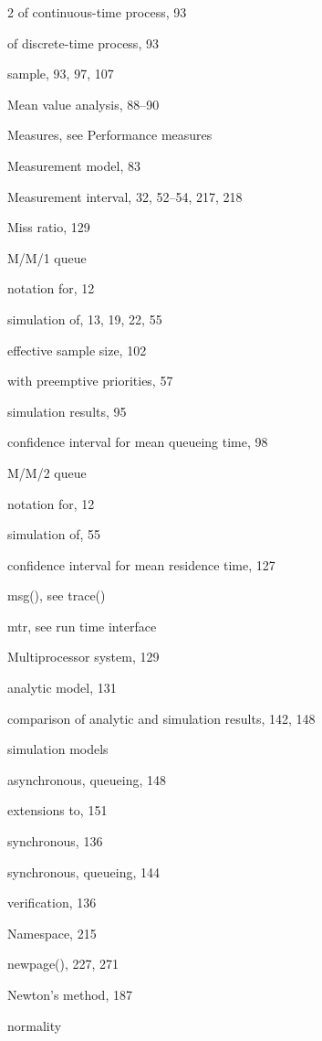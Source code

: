 \begin{multicols}{2}
\quad of continuous-time process, 93\par
\quad of discrete-time process, 93\par
\quad sample, 93, 97, 107\par
\noindent Mean value analysis, 88--90\par
\noindent Measures, see Performance measures\par
\noindent Measurement model, 83\par
\noindent Measurement interval, 32, 52--54, 217, 218\par
\noindent Miss ratio, 129\par
\columnbreak
\noindent M/M/1 queue\par
\quad notation for, 12\par
\quad simulation of, 13, 19, 22, 55\par
\qquad effective sample size, 102\par
\qquad with preemptive priorities, 57\par
\quad simulation results, 95\par
\qquad confidence interval for mean queueing time, 98\par
\noindent M/M/2 queue\par
\quad notation for, 12\par
\quad simulation of, 55\par
\qquad confidence interval for mean residence time, 127\par
\noindent msg(), see trace()\par
\noindent mtr, see run time interface\par
\noindent Multiprocessor system, 129\par
\quad analytic model, 131\par
\quad comparison of analytic and simulation results, 142, 148\par
\quad simulation models\par
\qquad asynchronous, queueing, 148\par
\qquad extensions to, 151\par
\qquad synchronous, 136\par
\qquad synchronous, queueing, 144\par
\quad verification, 136\par
\noindent Namespace, 215\par
\noindent newpage(), 227, 271\par
\noindent Newton's method, 187\par
\noindent normality\par

\end{multicols}

